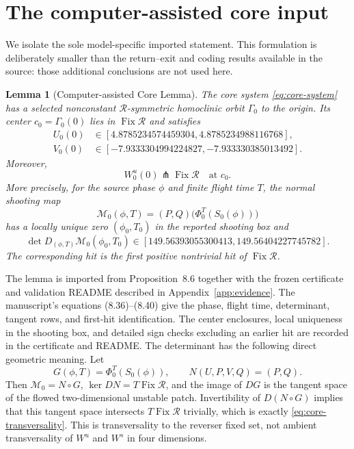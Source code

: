 \documentclass[11pt,reqno]{amsart}
\numberwithin{equation}{section}
\newtheorem{lemma}[theorem]{Lemma}
\theoremstyle{remark}
\newcommand{\Fix}{\operatorname{Fix}}
\newcommand{\cR}{\mathcal R}
\newcommand{\cM}{\mathcal M}
\begin{document}
\section{The computer-assisted core input}\label{sec:core}

We isolate the sole model-specific imported statement.  This formulation is
deliberately smaller than the return--exit and coding results available in the
source: those additional conclusions are not used here.

\begin{lemma}[Computer-assisted Core Lemma]\label{lem:core}
The core system \eqref{eq:core-system} has a selected nonconstant
$\cR$-symmetric homoclinic orbit $\Gamma_0$ to the origin.  Its center
$c_0=\Gamma_0(0)$ lies in $\Fix\cR$ and satisfies
\begin{equation}\label{eq:center-enclosures}
 \begin{aligned}
 U_0(0)&\in[4.8785234574459304,4.8785234988116768],\\
 V_0(0)&\in[-7.9333304994224827,-7.933330385013492].
 \end{aligned}
\end{equation}
Moreover,
\begin{equation}\label{eq:core-transversality}
 W^u_0(0)\pitchfork\Fix\cR
 \quad\text{at }c_0.
\end{equation}
More precisely, for the source phase $\phi$ and finite flight time $T$, the
normal shooting map
\[
 \cM_0(\phi,T)=(P,Q)\bigl(\Phi_0^T(S_0(\phi))\bigr)
\]
has a locally unique zero $(\phi_0,T_0)$ in the reported shooting box and
\begin{equation}\label{eq:det-enclosure}
 \det D_{(\phi,T)}\cM_0(\phi_0,T_0)
 \in[149.56393055300413,149.56404227745782].
\end{equation}
The corresponding hit is the first positive nontrivial hit of $\Fix\cR$.
\end{lemma}

The lemma is imported from Proposition~8.6 together with the frozen
certificate and validation README
described in Appendix~\ref{app:evidence}.  The manuscript's equations
(8.36)--(8.40) give the phase, flight time, determinant, tangent rows, and
first-hit identification.  The center enclosures, local uniqueness in the
shooting box, and detailed sign checks excluding an earlier hit are recorded
in the certificate and README.  The determinant has the following direct
geometric meaning.  Let
\[
 G(\phi,T)=\Phi_0^T(S_0(\phi)),
 \qquad N(U,P,V,Q)=(P,Q).
\]
Then $\cM_0=N\circ G$, $\ker DN=T\Fix\cR$, and the image of $DG$ is the
tangent space of the flowed two-dimensional unstable patch.  Invertibility
of $D(N\circ G)$ implies that this tangent space intersects $T\Fix\cR$
trivially, which is exactly \eqref{eq:core-transversality}.  This is
transversality to the reverser fixed set, not ambient transversality of
$W^u$ and $W^s$ in four dimensions.
\end{document}
